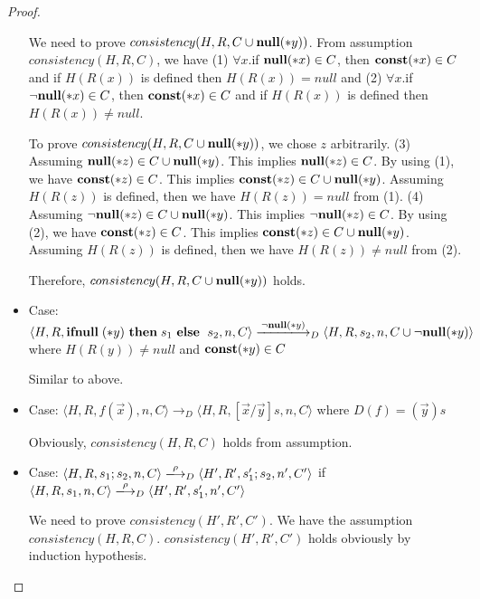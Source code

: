 \begin{proof}
\begin{itemize}
  We need to prove \(consistency(H, R, C\cup{\mathbf{null}(*y)}) \). From
  assumption \(consistency(H, R, C)\), we have (1) \(\forall x\).if
  \({\bf null}(*x) \in C\), then \(\mathbf{const}(*x) \in C\) and if \(H(R(x))\) is
  defined then \(H(R(x)) = null\) and (2) \(\forall x\).if \(\neg{\bf null}(*x)
  \in C\), then \(\mathbf{const}(*x) \in C\) and if \(H(R(x))\) is defined
  then \(H(R(x)) \ne null\).

  To prove \(consistency(H, R, C\cup{\mathbf{null}(*y)}) \), we chose \(z\)
  arbitrarily. (3) Assuming \(\mathbf{null}(*z) \in C\cup\mathbf{null}(*y)\). This
  implies \(\mathbf{null}(*z) \in C\). By using (1), we have \(\mathbf{const}(*z) \in
  C\). This implies \(\mathbf{const}(*z) \in C\cup\mathbf{null}(*y)\). Assuming
  \(H(R(z))\) is defined, then we have \(H(R(z)) = null\) from
  (1). (4) Assuming \(\neg\mathbf{null}(*z) \in C\cup\mathbf{null}(*y)\). This implies
  \(\neg\mathbf{null}(*z) \in C\). By using (2), we have \(\mathbf{const}(*z) \in C\). This
  implies \(\mathbf{const}(*z) \in C\cup\mathbf{null}(*y)\). Assuming \(H(R(z))\) is
  defined, then we have \(H(R(z)) \ne null\) from (2). 

  Therefore, \(consistency(H, R, C\cup{\mathbf{null}(*y)})\) holds.

\item Case: \(\langle H, R, \IFNULL(*y) \ \THEN s_1\ \ELSE\ s_2, n, C
  \rangle \xlongrightarrow{\neg\NULL(*y)}_D \langle H, R, s_2, n, C \cup{\neg\NULL(*y)}
  \rangle \) where \( H(R(y)) \ne  null \) and \(\mathbf{const}(*y) \in C\)

  Similar to above.  

\item Case: \(\langle H, R, f(\vec{x}), n, C \rangle \rightarrow_D
  \langle H, R, [\vec{x}/\vec{y}]s, n, C \rangle \) where \( D(f) = (\vec{y})s\)

  Obviously, \(consistency(H, R, C) \) holds from assumption.

\item Case: \(\langle H, R, s_1;s_2, n, C \rangle
  \xlongrightarrow{\rho}_{D} \langle H', R', s_1';s_2, n', C' \rangle
  \) if \(\langle H, R, s_1, n, C \rangle \xlongrightarrow{\rho}_{D}
  \langle H', R', s_1', n', C' \rangle\)

  We need to prove \(consistency(H', R', C')\). We have the assumption
  \(consistency(H, R, C)\). \(consistency(H', R', C')\) holds
  obviously by induction hypothesis.
  
 \end{itemize}
\end{proof}


